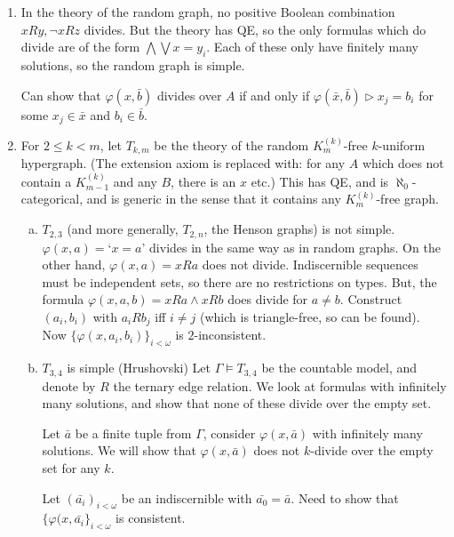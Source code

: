 \documentclass{article}
\let\models\vDash
\begin{document}
\begin{eg}\leavevmode
  \begin{enumerate}
    \item In the theory of the random graph, no positive Boolean combination $xRy, \neg x R z$ divides.
      But the theory has QE, so the only formulas which do divide are of the form $\bigwedge \bigvee x=y_i$.
      Each of these only have finitely many solutions, so the random graph is simple.

      Can show that $\varphi(x,\bar{b})$ divides over $A$ if and only if $\varphi(\bar{x},\bar{b}) \rhd x_j = b_i$ for some $x_j\in \bar{x}$ and $b_i \in \bar{b}$.
    \item For $2 \leq k < m$, let $T_{k,m}$ be the theory of the random $K_m^{(k)}$-free $k$-uniform hypergraph.
      (The extension axiom is replaced with: for any $A$ which does not contain a $K_{m-1}^{(k)}$ and any $B$, there is an $x$ etc.)
      This has QE, and is $\aleph_0$-categorical, and is generic in the sense that it contains any $K_m^{(k)}$-free graph.
      \begin{enumerate}[(a)]
        \item $T_{2,3}$ (and more generally, $T_{2,n}$, the Henson graphs) is not simple.
          $\varphi(x,a) = $`$x=a$' divides in the same way as in random graphs.
          On the other hand,
          $\varphi(x,a) = x R a$ does not divide. Indiscernible sequences must be independent sets, so there are no restrictions on types.
          But, the formula $\varphi(x,a,b) = x R a \land x R b$ does divide for $a \neq b$.
          Construct $(a_i,b_i)$ with $a_i R b_j$ iff $i \neq j$ (which is triangle-free, so can be found).
          Now $\{\varphi(x,a_i,b_i)\}_{i<\omega}$ is $2$-inconsistent.
        \item $T_{3,4}$ is simple (Hrushovski)
          Let $\Gamma \models T_{3,4}$ be the countable model, and denote by $R$ the ternary edge relation.
          We look at formulas with infinitely many solutions, and show that none of these divide over the empty set.

          Let $\bar{a}$ be a finite tuple from $\Gamma$, consider $\varphi(x,\bar{a})$ with infinitely many solutions.
          We will show that $\varphi(x,\bar{a})$ does not $k$-divide over the empty set for any $k$.

          Let $(\bar{a_i})_{i < \omega}$ be an indiscernible with $\bar{a_0} = \bar{a}$.
          Need to show that $\{\varphi(x,\bar{a_i}\}_{i < \omega}$ is consistent.


\end{enumerate}
\end{enumerate}
\end{eg}
\end{document}

